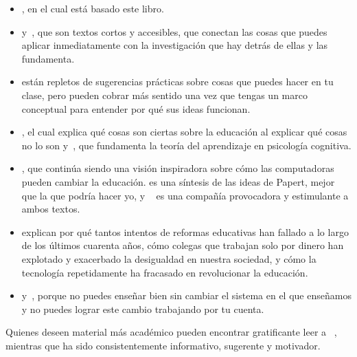 \begin{itemize}

\item
 ,
 en el cual está basado este libro. 
\item
 \cite{Lang2016} y~\cite{Hust2012}, que son textos cortos y accesibles, que conectan las cosas que puedes aplicar 
 inmediatamente con la investigación que hay detrás de ellas y las fundamenta. 

\item
 \cite{Berg2012,Lemo2014,Majo2015,Broo2016,Rice2018,Wein2018b}
 están repletos de sugerencias prácticas sobre cosas que puedes hacer en tu clase,
pero pueden cobrar más sentido una vez que tengas un marco conceptual para entender por qué sus ideas funcionan. 

\item
 \cite{DeBr2015},
 el cual explica qué cosas son ciertas sobre la educación al explicar qué cosas no lo son y~\cite{Dida2016},
 que fundamenta la teoría del aprendizaje en psicología cognitiva. 

\item
 \cite{Pape1993},
 que continúa siendo una visión inspiradora sobre cómo las computadoras pueden cambiar la educación.
 es una síntesis de las ideas de Papert, mejor que la que podría hacer yo, y ~\cite{Craw2010} es una compañía provocadora y estimulante a ambos textos.

\item
 \cite{Gree2014,McMi2017,Watt2014} explican por qué tantos intentos de reformas educativas 
 han fallado a lo largo de los últimos cuarenta años, cómo colegas que trabajan solo por dinero han explotado 
 y exacerbado la desigualdad en nuestra sociedad, y cómo la tecnología repetidamente ha fracasado en revolucionar la educación. 

\item
 \cite{Brow2007} y~\cite{Mann2015},
 porque no puedes enseñar bien sin cambiar el sistema en el que enseñamos
y no puedes lograr este cambio trabajando por tu cuenta.

\end{itemize}

Quienes deseen material más académico pueden encontrar gratificante leer a ~\cite{Guzd2015a,Hazz2014,Sent2018,Finc2019,Hpl2018},
mientras que  ha sido consistentemente informativo, sugerente y motivador.

